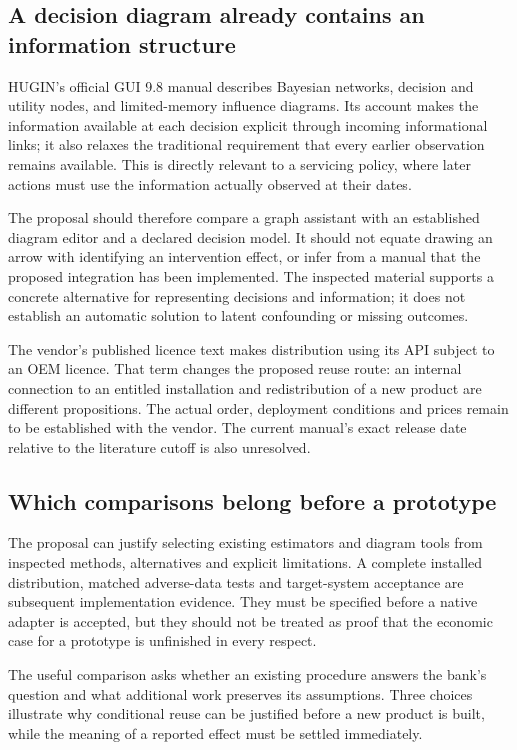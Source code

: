 \subsection{A decision diagram already contains an information structure}
HUGIN's official GUI 9.8 manual describes Bayesian networks, decision and
utility nodes, and limited-memory influence diagrams. Its account makes
the information available at each decision explicit through incoming
informational links; it also relaxes the traditional requirement that every
earlier observation remains available. This is directly relevant to a
servicing policy, where later actions must use the information actually
observed at their dates. \citep{gap29hugin}

The proposal should therefore compare a graph assistant with an established
diagram editor and a declared decision model. It should not equate drawing
an arrow with identifying an intervention effect, or infer from a manual
that the proposed integration has been implemented. The inspected material
supports a concrete alternative for representing decisions and information;
it does not establish an automatic solution to latent confounding or missing
outcomes.

The vendor's published licence text makes distribution using its API subject
to an OEM licence. That term changes the proposed reuse route: an internal
connection to an entitled installation and redistribution of a new product
are different propositions. The actual order, deployment conditions and
prices remain to be established with the vendor. The current manual's exact
release date relative to the literature cutoff is also unresolved.
\citep{gap29huginlicense}

\subsection{Which comparisons belong before a prototype}
The proposal can justify selecting existing estimators and diagram tools
from inspected methods, alternatives and explicit limitations. A complete
installed distribution, matched adverse-data tests and target-system
acceptance are subsequent implementation evidence. They must be specified
before a native adapter is accepted, but they should not be treated as
proof that the economic case for a prototype is unfinished in every respect.

The useful comparison asks whether an existing procedure answers the bank's
question and what additional work preserves its assumptions. Three choices
illustrate why conditional reuse can be justified before a new product is
built, while the meaning of a reported effect must be settled immediately.

